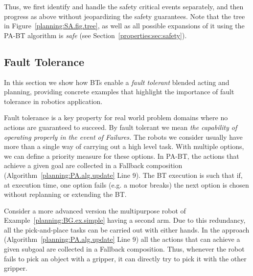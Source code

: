 Thus, we first identify and handle the safety critical events separately, and then progress as above without 
jeopardizing the safety guarantees.
Note that the tree in Figure~\ref{planning:SA.fig.tree}, as well as all possible expansions of it using the PA-BT algorithm is \emph{safe} (see Section~\ref{properties:sec:safety}).



\subsection{Fault Tolerance}
\label{planning:FT}
In this section we show how BTs enable a \emph{fault tolerant} blended acting and planning, providing concrete examples that highlight the importance of fault tolerance in robotics application.

Fault tolerance is a key property for real world problem domains where no actions are guaranteed to succeed. By fault tolerant we mean \emph{the capability of operating properly in the event of Failures.} The robots we consider usually have more than a single way of carrying out a high level task. %
With multiple options, we can define a priority measure for these options. In PA-BT, the actions that achieve a given goal are collected in a Fallback composition (Algorithm~\ref{planning:PA.alg.update} Line 9). The BT execution is such that if, at execution time, one option fails (e.g. a motor breaks) the next option is chosen without replanning or extending the BT.
%
%
\begin{example}
Consider a more advanced version the multipurpose robot of Example~\ref{planning:BG.ex.simple} having a second arm. Due to this redundancy, all the pick-and-place tasks can be carried out with either hands. In the approach (Algorithm~\ref{planning:PA.alg.update} Line 9) all the actions that can achieve a given subgoal are collected in a Fallback composition. Thus, whenever the robot fails to pick an object with a gripper, it can directly try to pick it with the other gripper.
\end{example}



